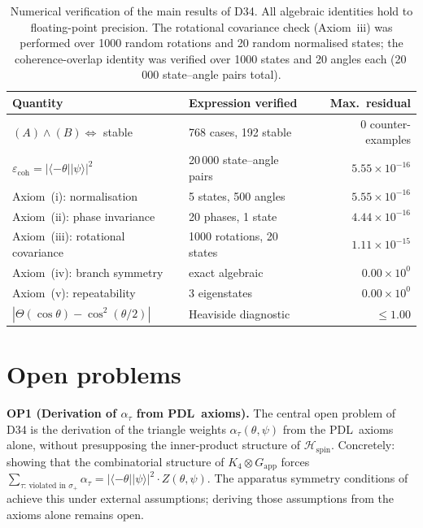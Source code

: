 \documentclass[11pt,a4paper]{article}
\theoremstyle{definition}
\newcommand{\PDL}{\textnormal{PDL}}
\newcommand{\Kfour}{K_4}
\newcommand{\Hspin}{\mathcal{H}_{\mathrm{spin}}}
\newcommand{\ecoh}{\varepsilon_{\mathrm{coh}}}
\newcommand{\pket}[1]{|#1\rangle}
\newcommand{\pbra}[1]{\langle#1|}
\begin{document}
\begin{table}[ht]
\centering
\caption{Numerical verification of the main results of D34. All algebraic identities hold to floating-point precision. The rotational covariance check (Axiom~iii) was performed over 1000 random rotations and 20 random normalised states; the coherence-overlap identity was verified over 1000 states and 20 angles each (20\,000 state--angle pairs total).}
\label{tab:axioms}
\begin{tabular}{llr}
\toprule
Quantity & Expression verified & Max.\ residual \\
\midrule
$(A)\wedge(B) \Leftrightarrow$ stable & 768 cases, 192 stable & 0 counter-examples \\
$\ecoh = |\pbra{-\theta}\pket{\psi}|^2$ & 20\,000 state--angle pairs & $5.55\times10^{-16}$ \\
Axiom~(i): normalisation & 5 states, 500 angles & $5.55\times10^{-16}$ \\
Axiom~(ii): phase invariance & 20 phases, 1 state & $4.44\times10^{-16}$ \\
Axiom~(iii): rotational covariance & 1000 rotations, 20 states & $1.11\times10^{-15}$ \\
Axiom~(iv): branch symmetry & exact algebraic & $0.00\times10^0$ \\
Axiom~(v): repeatability & 3 eigenstates & $0.00\times10^0$ \\
$|\Theta(\cos\theta) - \cos^2(\theta/2)|$ & Heaviside diagnostic & $\leq 1.00$ \\
\bottomrule
\end{tabular}
\end{table}

\section{Open problems}
\label{sec:open}

\textbf{OP1 (Derivation of $\alpha_\tau$ from \PDL\ axioms).} The central open problem of D34 is the derivation of the triangle weights $\alpha_\tau(\theta,\psi)$ from the \PDL\ axioms alone, without presupposing the inner-product structure of $\Hspin$. Concretely: showing that the combinatorial structure of $\Kfour \otimes G_{\mathrm{app}}$ forces $\sum_{\tau:\,\text{violated in }\sigma_+}\alpha_\tau = |\pbra{-\theta}\pket{\psi}|^2\cdot Z(\theta,\psi)$. The apparatus symmetry conditions of~\cite{Born_PDL_2026} achieve this under external assumptions; deriving those assumptions from the axioms alone remains open.
\end{document}
